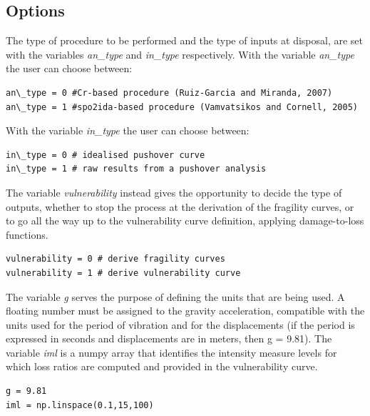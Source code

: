 \subsection{Options}
\label{sub:options}
The type of procedure to be performed and the type of inputs at disposal, are set with the variables \textit{an\_type} and \textit{in\_type} respectively. With the variable \textit{an\_type} the user can choose between:

\begin{Verbatim}[frame=single, commandchars=\\\{\}, samepage=true]
an\_type = 0 #Cr-based procedure (Ruiz-Garcia and Miranda, 2007)
an\_type = 1 #spo2ida-based procedure (Vamvatsikos and Cornell, 2005)
\end{Verbatim}

With the variable \textit{in\_type} the user can choose between:

\begin{Verbatim}[frame=single, commandchars=\\\{\}, samepage=true]
in\_type = 0 # idealised pushover curve
in\_type = 1 # raw results from a pushover analysis
\end{Verbatim}

The variable \textit{vulnerability} instead gives the opportunity to decide the type of outputs, whether to stop the process at the derivation of the fragility curves, or to go all the way up to the vulnerability curve definition, applying damage-to-loss functions.

\begin{Verbatim}[frame=single, commandchars=\\\{\}, samepage=true]
vulnerability = 0 # derive fragility curves 
vulnerability = 1 # derive vulnerability curve
\end{Verbatim}

The variable \textit{g} serves the purpose of defining the units that are being used. A floating number must be assigned to the gravity acceleration, compatible with the units used for the period of vibration and for the displacements (if the period is expressed in seconds and displacements are in meters, then g = 9.81). The variable \textit{iml} is a numpy array that identifies the intensity measure levels for which loss ratios are computed and provided in the vulnerability curve.

\begin{Verbatim}[frame=single, commandchars=\\\{\}, samepage=true]
g = 9.81
iml = np.linspace(0.1,15,100)
\end{Verbatim}

